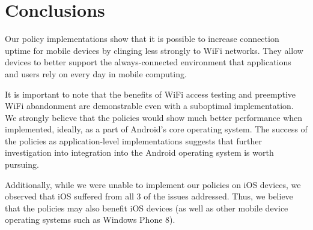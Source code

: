 \section{Conclusions}
\label{sec:conc}

Our policy implementations show that it is possible to increase connection uptime for mobile devices by clinging less strongly to WiFi networks. They allow devices to better support the always-connected environment that applications and users rely on every day in mobile computing.

It is important to note that the benefits of WiFi access testing and preemptive WiFi abandonment are demonstrable even with a suboptimal implementation. We strongly believe that the policies would show much better performance when implemented, ideally, as a part of Android's core operating system. The success of the policies as application-level implementations suggests that further investigation into integration into the Android operating system is worth pursuing.

Additionally, while we were unable to implement our policies on iOS devices, we observed that iOS suffered from all 3 of the issues addressed. Thus, we believe that the policies may also benefit iOS devices (as well as other mobile device operating systems such as Windows Phone 8).
